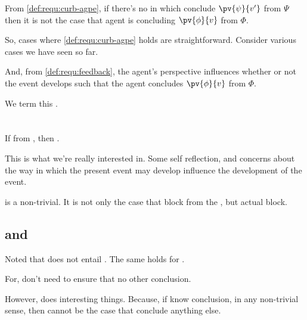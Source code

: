 \begin{note}
  From \ref{def:requ:curb-agpe}, if there's no \pevent{} in which conclude \(\pv{\psi}{v'}\) from \(\Psi\) then it is not the case that agent is concluding \(\pv{\phi}{v}\) from \(\Phi\).

  So, cases where \ref{def:requ:curb-agpe} holds are straightforward.
  Consider various cases we have seen so far.

  And, from \ref{def:requ:feedback}, the agent's perspective influences whether or not the event develops such that the agent concludes \(\pv{\phi}{v}\) from \(\Phi\).

  We term this \feedback{}.
\end{note}


\section{}

\begin{note}
  \begin{definition}[\feedback{2}]
    If \curb{} from \agpe{}, then \curb{}.
  \end{definition}

  This is what we're really interested in.
  Some self reflection, and concerns about the way in which the present event may develop influence the development of the event.
\end{note}

\begin{note}
  \feedback{} is a non-trivial.
  It is not only the case that block from the \agpe{}, but actual block.
\end{note}

\subsection{ and }
\label{sec:fc}

\begin{note}
  Noted that \curb{} does not entail \fc{}.
  The same holds for .

  For, don't need to ensure that no other conclusion.

  However,  does interesting things.
  Because, if know conclusion, in any non-trivial sense, then cannot be the case that conclude anything else.
\end{note}


